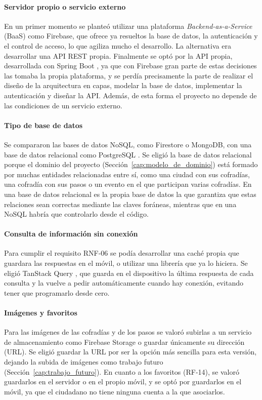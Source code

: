 \paragraph{Servidor propio o servicio externo}
En un primer momento se planteó utilizar una plataforma \emph{Backend-as-a-Service} (BaaS) como Firebase, que ofrece ya resueltos la base de datos, la autenticación y el control de acceso, lo que agiliza mucho el desarrollo. La alternativa era desarrollar una API REST propia. Finalmente se optó por la API propia, desarrollada con Spring Boot \cite{springboot}, ya que con Firebase gran parte de estas decisiones las tomaba la propia plataforma, y se perdía precisamente la parte de realizar el diseño de la arquitectura en capas, modelar la base de datos, implementar la autenticación y diseñar la API. Además, de esta forma el proyecto no depende de las condiciones de un servicio externo.

\paragraph{Tipo de base de datos}
Se compararon las bases de datos NoSQL, como Firestore o MongoDB, con una base de datos relacional como PostgreSQL \cite{postgresql}. Se eligió la base de datos relacional porque el dominio del proyecto (Sección~\ref{cap:modelo_de_dominio}) está formado por muchas entidades relacionadas entre sí, como una ciudad con sus cofradías, una cofradía con sus pasos o un evento en el que participan varias cofradías. En una base de datos relacional es la propia base de datos la que garantiza que estas relaciones sean correctas mediante las claves foráneas, mientras que en una NoSQL habría que controlarlo desde el código.

\paragraph{Consulta de información sin conexión}
Para cumplir el requisito RNF-06 se podía desarrollar una caché propia que guardara las respuestas en el móvil, o utilizar una librería que ya lo hiciera. Se eligió TanStack Query \cite{reactquery}, que guarda en el dispositivo la última respuesta de cada consulta y la vuelve a pedir automáticamente cuando hay conexión, evitando tener que programarlo desde cero.

\paragraph{Imágenes y favoritos}
Para las imágenes de las cofradías y de los pasos se valoró subirlas a un servicio de almacenamiento como Firebase Storage \cite{firebasestorage} o guardar únicamente su dirección (URL). Se eligió guardar la URL por ser la opción más sencilla para esta versión, dejando la subida de imágenes como trabajo futuro (Sección~\ref{cap:trabajo_futuro}). En cuanto a los favoritos (RF-14), se valoró guardarlos en el servidor o en el propio móvil, y se optó por guardarlos en el móvil, ya que el ciudadano no tiene ninguna cuenta a la que asociarlos.

